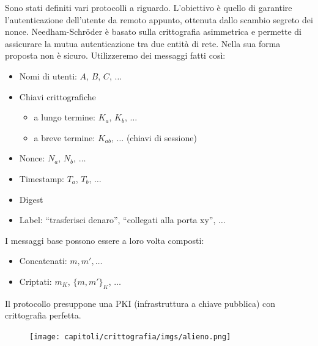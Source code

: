 Sono stati definiti vari protocolli a riguardo. L'obiettivo è quello di
garantire l'autenticazione
dell'utente da remoto appunto, ottenuta dallo scambio segreto dei nonce.
Needham-Schröder è basato sulla crittografia asimmetrica e permette
di assicurare la mutua
autenticazione tra due entità di rete. Nella sua forma proposta
non è sicuro.
Utilizzeremo dei messaggi fatti così:

\begin{itemize}
    \item Nomi di utenti: \(A\), \(B\), \(C\), \(\ldots \)
    \item Chiavi crittografiche
          \begin{itemize}
              \item a lungo termine: \(K_a\), \(K_b\), \(\ldots \)
              \item a breve termine: \(K_{ab}\),  \(\ldots \) (chiavi di sessione)
          \end{itemize}
    \item Nonce: \(N_a\), \(N_b\), \(\ldots \)
    \item Timestamp: \(T_a\), \(T_b\), \(\ldots \)
    \item Digest
    \item Label: ``trasferisci denaro'', ``collegati alla porta xy'', \(\ldots \)
\end{itemize}

I messaggi base possono essere a loro volta composti:
\begin{itemize}
    \item Concatenati: \(m, m', \ldots\)
    \item Criptati: \(m_K\), \(\{m,m'\}_K\), \(\ldots\)
\end{itemize}

Il protocollo presuppone una PKI (infrastruttura a chiave pubblica)
con crittografia perfetta.

\begin{figure}[H]
    \centering
    \texttt{[image: capitoli/crittografia/imgs/alieno.png]}
\end{figure}

